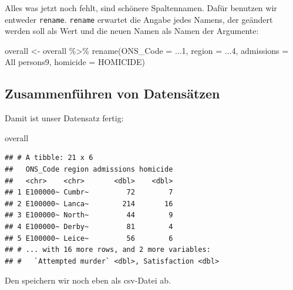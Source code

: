 \documentclass[
]{book}
\newenvironment{Shaded}{\begin{snugshade}}{\end{snugshade}}
\newcommand{\FunctionTok}[1]{\textcolor[rgb]{0.00,0.00,0.00}{#1}}
\newcommand{\NormalTok}[1]{#1}
\newcommand{\OtherTok}[1]{\textcolor[rgb]{0.56,0.35,0.01}{#1}}
\newcommand{\SpecialCharTok}[1]{\textcolor[rgb]{0.00,0.00,0.00}{#1}}
\newcommand{\StringTok}[1]{\textcolor[rgb]{0.31,0.60,0.02}{#1}}
\begin{document}
Alles was jetzt noch fehlt, sind schönere Spaltennamen. Dafür benutzen wir entweder \texttt{rename}.
\texttt{rename} erwartet die Angabe jedes Namens, der geändert werden soll als Wert und die neuen Namen als Namen der Argumente:

\begin{Shaded}
\begin{Highlighting}[]
\NormalTok{overall }\OtherTok{\textless{}{-}}\NormalTok{ overall }\SpecialCharTok{\%\textgreater{}\%} 
  \FunctionTok{rename}\NormalTok{(}\StringTok{\textquotesingle{}ONS\_Code\textquotesingle{}} \OtherTok{=} \StringTok{\textquotesingle{}...1\textquotesingle{}}\NormalTok{,}
         \StringTok{\textquotesingle{}region\textquotesingle{}} \OtherTok{=} \StringTok{\textquotesingle{}...4\textquotesingle{}}\NormalTok{,}
         \StringTok{\textquotesingle{}admissions\textquotesingle{}} \OtherTok{=} \StringTok{\textquotesingle{}All persons9\textquotesingle{}}\NormalTok{,}
         \StringTok{\textquotesingle{}homicide\textquotesingle{}} \OtherTok{=} \StringTok{\textquotesingle{}HOMICIDE\textquotesingle{}}\NormalTok{)}
\end{Highlighting}
\end{Shaded}

\hypertarget{zusammenfuxfchren-von-datensuxe4tzen-4}{%
\subsection{Zusammenführen von Datensätzen}\label{zusammenfuxfchren-von-datensuxe4tzen-4}}

Damit ist unser Datensatz fertig:

\begin{Shaded}
\begin{Highlighting}[]
\NormalTok{overall}
\end{Highlighting}
\end{Shaded}

\begin{verbatim}
## # A tibble: 21 x 6
##   ONS_Code region admissions homicide
##   <chr>    <chr>       <dbl>    <dbl>
## 1 E100000~ Cumbr~         72        7
## 2 E100000~ Lanca~        214       16
## 3 E100000~ North~         44        9
## 4 E100000~ Derby~         81        4
## 5 E100000~ Leice~         56        6
## # ... with 16 more rows, and 2 more variables:
## #   `Attempted murder` <dbl>, Satisfaction <dbl>
\end{verbatim}

Den speichern wir noch eben als csv-Datei ab.
\end{document}
